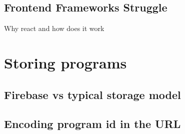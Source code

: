 \subsection{Frontend Frameworks Struggle}
Why react and how does it work

\section{Storing programs}

\subsection{Firebase vs typical storage model}

\subsection{Encoding program id in the URL}